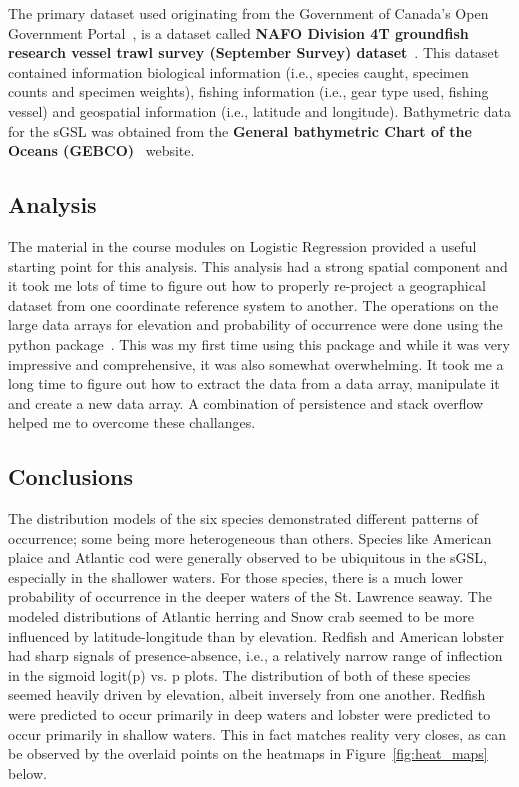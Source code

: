 The primary dataset used originating from the Government of Canada's Open Government Portal~\cite{ogp}, is a dataset called
\textbf{NAFO Division 4T groundfish research vessel trawl survey (September Survey) dataset}~\cite{groundfish}.
This dataset contained information biological information (i.e., species caught, specimen counts and specimen weights),
fishing information (i.e., gear type used, fishing vessel) and geospatial information (i.e., latitude and longitude).
Bathymetric data for the sGSL was obtained from the \textbf{General bathymetric Chart of the Oceans (GEBCO)}~\cite{gebco} website.


\subsection{Analysis}

The material in the course modules on Logistic Regression provided a useful starting point for this analysis.
This analysis had a strong spatial component and it took me lots of time to figure out how to properly re-project a geographical dataset
from one coordinate reference system to another.
The operations on the large data arrays for elevation and probability of occurrence were done using the  python package~\cite{xarray}.
This was my first time using this package and while it was very impressive and comprehensive, it was also somewhat overwhelming.
It took me a long time to figure out how to extract the data from a data array, manipulate it and create a new data array.
A combination of persistence and stack overflow helped me to overcome these challanges.

\subsection{Conclusions}

The distribution models of the six species demonstrated different patterns of occurrence; some being more heterogeneous than others.
Species like American plaice and Atlantic cod were generally observed to be ubiquitous in the sGSL, especially in the shallower waters.
For those species, there is a much lower probability of occurrence in the deeper waters of the St. Lawrence seaway.
The modeled distributions of Atlantic herring and Snow crab seemed to be more influenced by latitude-longitude than by elevation.
Redfish and American lobster had sharp signals of presence-absence, i.e., a relatively narrow range of inflection in the sigmoid
logit(p) vs. p plots.
The distribution of both of these species seemed heavily driven by elevation, albeit inversely from one another.
Redfish were predicted to occur primarily in deep waters and lobster were predicted to occur primarily in shallow waters.
This in fact matches reality very closes, as can be observed by the overlaid points on the heatmaps in Figure~\ref{fig:heat_maps} below.



